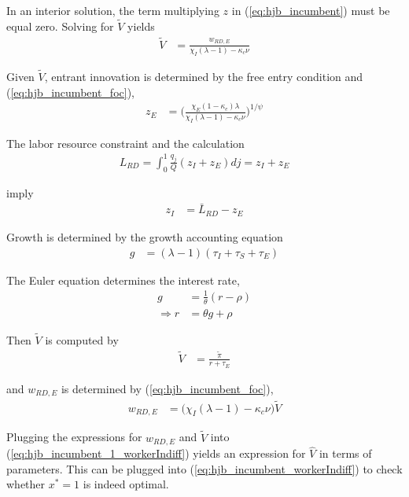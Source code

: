 \documentclass[12pt,english]{article}
\theoremstyle{remark}
\begin{document}
In an interior solution, the term multiplying $z$ in (\ref{eq:hjb_incumbent}) must be equal zero. Solving for $\tilde{V}$ yields
\begin{align}
	\tilde{V} &= \frac{w_{RD,E}}{\chi_I(\lambda - 1) - \kappa_{c} \nu} \label{eq:hjb_incumbent_foc}
\end{align}

Given $\tilde{V}$, entrant innovation is determined by the free entry condition and (\ref{eq:hjb_incumbent_foc}),
\begin{align}
	z_E &= \Big( \frac{\chi_E (1-\kappa_{e}) \lambda}{\chi_I(\lambda-1) - \kappa_c \nu } \Big)^{1/\psi} \label{eq:effort_entrant}
\end{align}

The labor resource constraint and the calculation
\begin{align}
	L_{RD} = \int_0^1 \frac{q_j}{Q} (z_{I} + z_{E}) dj = z_I + z_E
\end{align}
 
imply 
\begin{align}
	z_I &= \bar{L}_{RD} - z_E \label{eq:zI_asFuncZe}
\end{align}

Growth is determined by the growth accounting equation
\begin{align}
g &= (\lambda - 1)(\tau_I + \tau_S + \tau_E) \label{eq:growth_accounting}
\end{align}

The Euler equation determines the interest rate, 
\begin{align}
	g &= \frac{1}{\theta} (r - \rho) \label{eq:euler} \\
	\Rightarrow r &= \theta g + \rho \nonumber
\end{align}

Then $\tilde{V}$ is computed by 
\begin{align*}
	\tilde{V} &= \frac{\tilde{\pi}}{r + \tau_E}
\end{align*}

and $w_{RD,E}$ is determined by (\ref{eq:hjb_incumbent_foc}), 
\begin{align*}
	w_{RD,E} &= \big( \chi_I (\lambda - 1) - \kappa_c \nu  \big) \tilde{V}
\end{align*}

Plugging the expressions for $w_{RD,E}$ and $\tilde{V}$ into (\ref{eq:hjb_incumbent_1_workerIndiff}) yields an expression for $\hat{V}$ in terms of parameters. This can be plugged into (\ref{eq:hjb_incumbent_workerIndiff}) to check whether $x^* = 1$ is indeed optimal.
\end{document}
